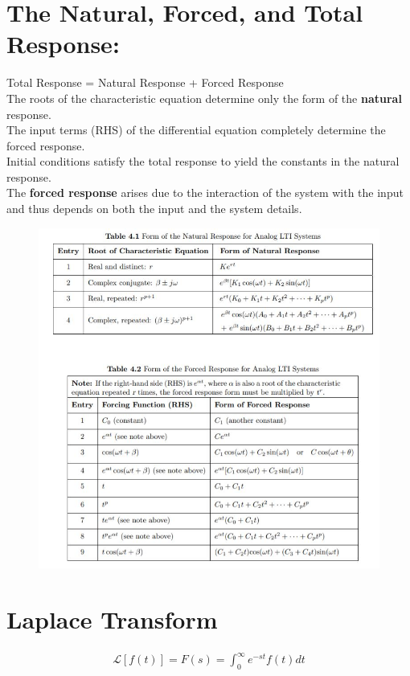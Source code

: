 \documentclass[13pt,a4paper]{article}
\begin{document}
\section{The Natural, Forced, and Total Response:}
Total Response = Natural Response + Forced Response\\
The roots of the characteristic equation determine only the form of the \textbf{natural} response.\\
The input terms (RHS) of the differential equation completely determine the forced response.\\
Initial conditions satisfy the total response to yield the constants in the natural response.\\
The \textbf{forced response} arises due to the interaction of the system with the input and thus depends on both the input and the system details.
\begin{figure}[H]
    \centering
    \includegraphics{Ne.JPG}
\end{figure}
\cleardoublepage

\section{Laplace Transform}
\begin{gather*}
    \mathscr{L}[f(t)]=F(s)=\int_0^\infty e^{-st}f(t)dt
\end{gather*}
\end{document}
